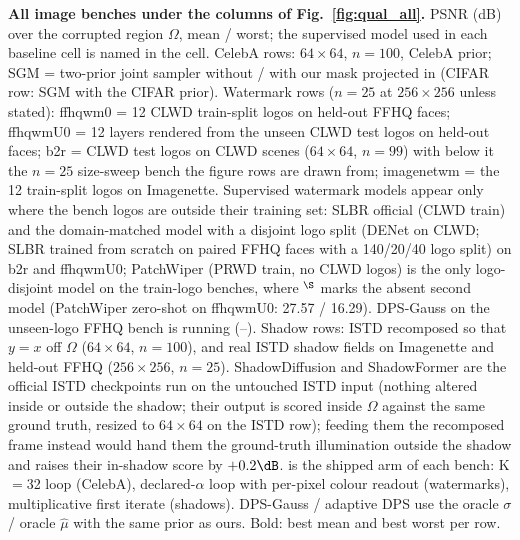 \newcommand{\bl}[2]{{\scriptsize #1}\;#2}
\begin{table}[t]
    \centering
    \caption{
    \textbf{All image benches under the columns of Fig.~\ref{fig:qual_all}.} PSNR (dB) over the corrupted region $\Omega$, mean / worst; the supervised model used in each baseline cell is named in the cell. CelebA rows: $64\times64$, $n{=}100$, CelebA prior; SGM = two-prior joint sampler without / with our mask projected in (CIFAR row: SGM with the CIFAR prior). Watermark rows ($n{=}25$ at $256\times256$ unless stated): ffhqwm0 = 12 CLWD train-split logos on held-out FFHQ faces; ffhqwmU0 = 12 layers rendered from the unseen CLWD test logos on held-out faces; b2r = CLWD test logos on CLWD scenes ($64\times64$, $n{=}99$) with below it the $n{=}25$ size-sweep bench the figure rows are drawn from; imagenetwm = the 12 train-split logos on Imagenette. Supervised watermark models appear only where the bench logos are outside their training set: SLBR official (CLWD train) and the domain-matched model with a disjoint logo split (DENet on CLWD; SLBR trained from scratch on paired FFHQ faces with a 140/20/40 logo split) on b2r and ffhqwmU0; PatchWiper (PRWD train, no CLWD logos) is the only logo-disjoint model on the train-logo benches, where $^\S$ marks the absent second model (PatchWiper zero-shot on ffhqwmU0: 27.57 / 16.29). DPS-Gauss on the unseen-logo FFHQ bench is running (--). Shadow rows: ISTD recomposed so that $y=x$ off $\Omega$ ($64\times64$, $n{=}100$), and real ISTD shadow fields on Imagenette and held-out FFHQ ($256\times256$, $n{=}25$). ShadowDiffusion and ShadowFormer are the official ISTD checkpoints run on the untouched ISTD input (nothing altered inside or outside the shadow; their output is scored inside $\Omega$ against the same ground truth, resized to $64\times64$ on the ISTD row); feeding them the recomposed frame instead would hand them the ground-truth illumination outside the shadow and raises their in-shadow score by $+0.2\dB$. \methodmin{} is the shipped arm of each bench: K$=$32 loop (CelebA), declared-$\alpha$ loop with per-pixel colour readout (watermarks), multiplicative first iterate (shadows). DPS-Gauss / adaptive DPS use the oracle $\sigma$ / oracle $\hat\mu$ with the same prior as ours. Bold: best mean and best worst per row.
}
\end{table}
